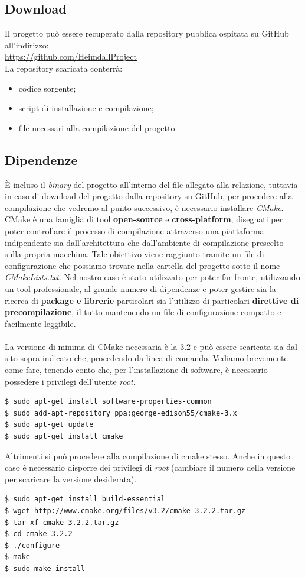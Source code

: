 \documentclass[italian]{tktltiki2}
\begin{document}
\subsection{Download}
Il progetto può essere recuperato dalla repository pubblica ospitata su GitHub all'indirizzo:
\\
\url{https://github.com/HeimdallProject} 
\\
La repository scaricata conterrà:
\begin{itemize}
  \item codice sorgente;
  \item script di installazione e compilazione;
  \item file necessari alla compilazione del progetto.
\end{itemize}
\subsection{Dipendenze}
È incluso il \emph{binary} del progetto all'interno del file allegato alla relazione, tuttavia in caso di download del progetto dalla repository su GitHub, per procedere alla compilazione che vedremo al punto successivo, è necessario installare \emph{CMake}.\\
CMake\cite{cmake} è una famiglia di tool \textbf{open-source} e \textbf{cross-platform}, disegnati per poter controllare il processo di compilazione attraverso una piattaforma indipendente sia dall'architettura che dall'ambiente di compilazione prescelto sulla propria macchina. Tale obiettivo viene raggiunto tramite un file di configurazione che possiamo trovare nella cartella del progetto sotto il nome \emph{CMakeLists.txt}. Nel nostro caso è stato utilizzato per poter far fronte, utilizzando un tool professionale, al grande numero di dipendenze e poter gestire sia la ricerca di \textbf{package e librerie} particolari sia l'utilizzo di particolari \textbf{direttive di precompilazione}, il tutto mantenendo un file di configurazione compatto e facilmente leggibile. \\\\
La versione di minima di CMake necessaria è la 3.2 e può essere scaricata sia dal sito sopra indicato che, procedendo da linea di comando. Vediamo brevemente come fare, tenendo conto che, per l'installazione di software, è necessario possedere i privilegi dell'utente \emph{root}.
\begin{lstlisting}
$ sudo apt-get install software-properties-common
$ sudo add-apt-repository ppa:george-edison55/cmake-3.x
$ sudo apt-get update
$ sudo apt-get install cmake
\end{lstlisting}
Altrimenti si può procedere alla compilazione di cmake stesso. Anche in questo caso è necessario disporre dei privilegi di \emph{root} (cambiare il numero della versione per scaricare la versione desiderata).
\begin{lstlisting}
$ sudo apt-get install build-essential
$ wget http://www.cmake.org/files/v3.2/cmake-3.2.2.tar.gz
$ tar xf cmake-3.2.2.tar.gz
$ cd cmake-3.2.2
$ ./configure
$ make
$ sudo make install
\end{lstlisting}
\end{document}
